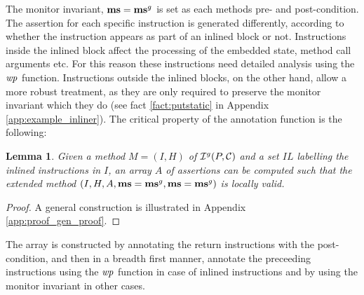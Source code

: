 \documentclass[10pt,twocolumn]{article}
\newtheorem{lemma}{Lemma}
\newcommand{\WP}{{\it wp}}
\newcommand{\IL}{\mathit{IL}}
\newcommand{\MS}{{\bf ms}}
\newcommand{\Contract}{\mathcal{C}}
\begin{document}
The monitor invariant, $\MS = \MS^g$ is set as each methods pre- and 
post-condition. The assertion for each specific instruction is generated 
differently, according to whether the instruction appears as part of an 
inlined block or not. Instructions inside the inlined block affect the 
processing of the embedded state, method call arguments etc. For this 
reason these instructions need detailed analysis using the $\WP$ function. 
Instructions outside the inlined blocks, on the other hand, allow a more 
robust treatment, as they are only required to preserve the monitor invariant 
which they do (see fact \ref{fact:putstatic} in Appendix \ref{app:example_inliner}). The critical property of 
the annotation function is the following:
\begin{lemma}\label{lem:ex_proof_gen}
Given a method $M = (I, H)$ of ${\cal I}^g(P, \Contract)$ and a set $\IL$ 
labelling the inlined instructions in $I$, an array $A$ of assertions can 
be computed such that the extended method $(I,H,A, \MS=\MS^g, \MS=\MS^g)$ 
is locally valid.
\end{lemma}
\begin{proof}
A general construction is illustrated in Appendix \ref{app:proof_gen_proof}.
\end{proof}
The array is constructed by annotating the return 
instructions with the post-condition, and then in a breadth first manner, 
annotate the preceeding instructions using the $\WP$ function in case of 
inlined instructions and by using the monitor invariant in other cases.
\end{document}
